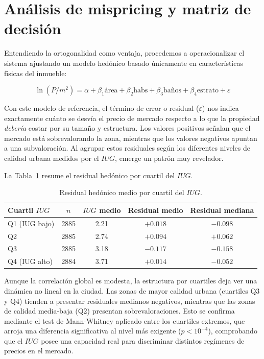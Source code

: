 \documentclass[12pt, a4paper, twoside, openright]{report}
\theoremstyle{plain}
\theoremstyle{definition}
\newcommand{\IUG}{IUG}             %
\begin{document}
\section{Análisis de mispricing y matriz de decisión}\label{sec:matriz_decision}

Entendiendo la ortogonalidad como ventaja, procedemos a operacionalizar el sistema ajustando un modelo hedónico basado únicamente en características físicas del inmueble:

\begin{equation}
    \ln(P/m^2) = \alpha + \beta_1 \text{\'area} + \beta_2 \text{habs} + \beta_3 \text{ba\~nos} + \beta_4 \text{estrato} + \varepsilon
\end{equation}

Con este modelo de referencia, el término de error o residual ($\varepsilon$) nos indica exactamente cuánto se desvía el precio de mercado respecto a lo que la propiedad \emph{debería} costar por su tamaño y estructura. Los valores positivos señalan que el mercado está sobrevalorando la zona, mientras que los valores negativos apuntan a una subvaloración. Al agrupar estos residuales según los diferentes niveles de calidad urbana medidos por el $\IUG$, emerge un patrón muy revelador.

La Tabla~\ref{tab:cuartiles_residual} resume el residual hedónico por cuartil del $\IUG$.

\begin{table}[htbp]
\centering
\caption{Residual hedónico medio por cuartil del $\IUG$.}
\label{tab:cuartiles_residual}
\small
\begin{tabular}{@{}lcccc@{}}
\toprule
\textbf{Cuartil $\IUG$} & $n$ & $\IUG$ \textbf{medio} & \textbf{Residual medio} & \textbf{Residual mediana} \\
\midrule
Q1 (IUG bajo)  & \num{2885} & 2.21 & $+0.018$ & $-0.098$ \\
Q2             & \num{2885} & 2.74 & $+0.094$ & $+0.062$ \\
Q3             & \num{2885} & 3.18 & $-0.117$ & $-0.158$ \\
Q4 (IUG alto)  & \num{2884} & 3.71 & $+0.014$ & $-0.052$ \\
\bottomrule
\end{tabular}
\end{table}

Aunque la correlación global es modesta, la estructura por cuartiles deja ver una dinámica no lineal en la ciudad. Las zonas de mayor calidad urbana (cuartiles Q3 y Q4) tienden a presentar residuales medianos negativos, mientras que las zonas de calidad media-baja (Q2) presentan sobrevaloraciones. Esto se confirma mediante el test de Mann-Whitney aplicado entre los cuartiles extremos, que arroja una diferencia significativa al nivel más exigente ($p < 10^{-4}$), comprobando que el $\IUG$ posee una capacidad real para discriminar distintos regímenes de precios en el mercado.
\end{document}
